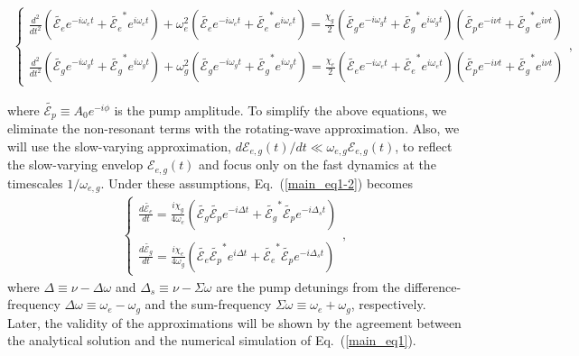 \documentclass[aps,prl,nobibnotes,nofootinbib,showpacs,reprint]{revtex4-1}
\newcommand{\Eq}[1]{Eq.~(\ref{#1})}
\newcommand{\Ep}{\tilde{\mathcal{E}_{p}}}
\newcommand{\Ee}{\tilde{\mathcal{E}_{e}}}
\newcommand{\Eg}{\tilde{\mathcal{E}_{g}}}
\newcommand{\we}{\omega_{e}}
\newcommand{\wg}{\omega_{g}}
\newcommand{\chie}{\chi_{e}}
\newcommand{\chig}{\chi_{g}}
\newcommand{\Dw}{\Delta \omega}
\newcommand{\Sw}{\Sigma \omega}
\newcommand{\Dv}{\Delta}
\newcommand{\Dvs}{\Delta_{s}}
\begin{document}
\begin{widetext}
\begin{equation}\label{main_eq1-2}
	\begin{split}
	\left\{
	\begin{array}{l}
	\displaystyle  \frac{d^2}{dt^2}\left( \Ee e^{-i\we t} +  \Ee^{\ast} e^{i\we t} \right) + \we^2 \left( \Ee e^{-i\we t} +  \Ee^{\ast} e^{i\we t} \right) = \frac{\chig}{2} \left( \Eg e^{-i\wg t} +  \Eg^{\ast} e^{i\wg t}  \right)\left( \Ep e^{-i\nu t} +  \Eg^{\ast} e^{i\nu t}  \right)  	\\	\\
	\displaystyle  \frac{d^2}{dt^2}\left( \Eg e^{-i\wg t} +  \Eg^{\ast} e^{i\wg t} \right) + \wg^2 \left( \Eg e^{-i\wg t} +  \Eg^{\ast} e^{i\wg t} \right) = \frac{\chie}{2} \left( \Ee e^{-i\we t} +  \Ee^{\ast} e^{i\we t}  \right)\left( \Ep e^{-i\nu t} +  \Eg^{\ast} e^{i\nu t}  \right)  
	\end{array}
	\right. 	,
	\end{split}
\end{equation}
\end{widetext}
where $\Ep \equiv A_{0} e^{-i\phi}$ is the pump amplitude. To simplify the above equations, we eliminate the non-resonant terms with the rotating-wave approximation. Also, we will use the slow-varying approximation, $d\mathcal{E}_{e,g}(t)/dt \ll \omega_{e,g}\mathcal{E}_{e,g}(t)$, to reflect the slow-varying envelop $\mathcal{E}_{e,g}(t)$ and focus only on the fast dynamics at the timescales $1/\omega_{e,g}$. Under these assumptions, \Eq{main_eq1-2} becomes
\begin{equation}\label{main_eq2}
	\begin{split}
	\left\{
	\begin{array}{l}
	\displaystyle  \frac{d\Ee}{dt} = \frac{i\chig}{4\we} \left( \Eg\Ep e^{-i\Dv t} +  \Eg^{\ast}\Ep e^{-i\Dvs t} \right)  	\\	\\
	\displaystyle  \frac{d\Eg}{dt} = \frac{i\chie}{4\wg} \left( \Ee\Ep^{\ast} e^{i\Dv t} +  \Ee^{\ast}\Ep e^{-i\Dvs t} \right)
	\end{array}
	\right. 	,
	\end{split}
\end{equation}
where $\Dv \equiv \nu - \Dw$ and $\Dvs \equiv \nu - \Sw$ are the pump detunings from the difference-frequency $\Dw \equiv \we - \wg$ and the sum-frequency $\Sw \equiv \we + \wg$, respectively. Later, the validity of the approximations will be shown by the agreement between the analytical solution and the numerical simulation of \Eq{main_eq1}. 
\end{document}
